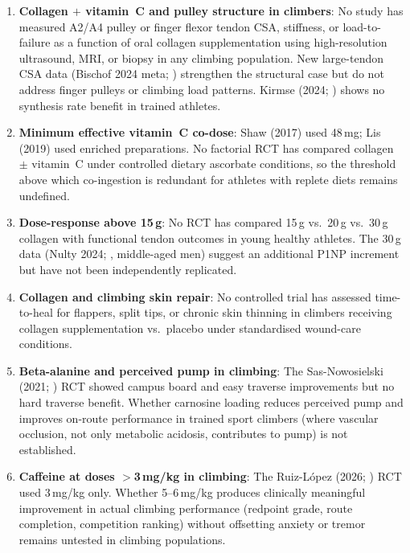 \begin{enumerate}[noitemsep]

  \item \textbf{Collagen $+$ vitamin~C and pulley structure in climbers}: No study has measured A2/A4 pulley or finger flexor tendon CSA, stiffness, or load-to-failure as a function of oral collagen supplementation using high-resolution ultrasound, MRI, or biopsy in any climbing population. New large-tendon CSA data (Bischof 2024 meta; \cite{BMSK24}) strengthen the structural case but do not address finger pulleys or climbing load patterns. Kirmse (2024; \cite{KLV+24}) shows no synthesis rate benefit in trained athletes.

  \item \textbf{Minimum effective vitamin~C co-dose}: Shaw (2017) used 48\,mg; Lis (2019) used enriched preparations. No factorial RCT has compared collagen $\pm$ vitamin~C under controlled dietary ascorbate conditions, so the threshold above which co-ingestion is redundant for athletes with replete diets remains undefined.

  \item \textbf{Dose-response above 15\,g}: No RCT has compared 15\,g vs.\ 20\,g vs.\ 30\,g collagen with functional tendon outcomes in young healthy athletes. The 30\,g data (Nulty 2024; \cite{NTD+24}, middle-aged men) suggest an additional P1NP increment but have not been independently replicated.

  \item \textbf{Collagen and climbing skin repair}: No controlled trial has assessed time-to-heal for flappers, split tips, or chronic skin thinning in climbers receiving collagen supplementation vs.\ placebo under standardised wound-care conditions.

  \item \textbf{Beta-alanine and perceived pump in climbing}: The Sas-Nowosielski (2021; \cite{SNWK21}) RCT showed campus board and easy traverse improvements but no hard traverse benefit. Whether carnosine loading reduces perceived pump and improves on-route performance in trained sport climbers (where vascular occlusion, not only metabolic acidosis, contributes to pump) is not established.

  \item \textbf{Caffeine at doses $>$3\,mg/kg in climbing}: The Ruiz-L\'opez (2026; \cite{RLMAMR+26}) RCT used 3\,mg/kg only. Whether 5--6\,mg/kg produces clinically meaningful improvement in actual climbing performance (redpoint grade, route completion, competition ranking) without offsetting anxiety or tremor remains untested in climbing populations.


\end{enumerate}
